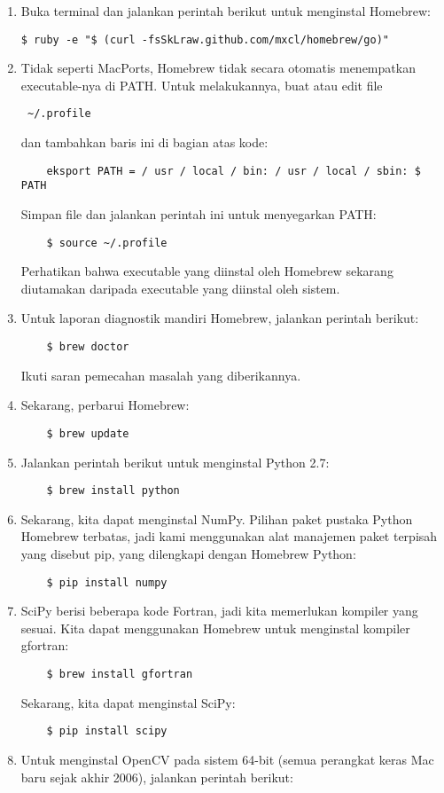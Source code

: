 \begin{enumerate}
	\item Buka terminal dan jalankan perintah berikut untuk menginstal Homebrew:
	\begin{verbatim}$ ruby ​​-e "$ (curl -fsSkLraw.github.com/mxcl/homebrew/go)" \end{verbatim} 
	\item Tidak seperti MacPorts, Homebrew tidak secara otomatis menempatkan executable-nya di PATH. Untuk melakukannya, buat atau edit file \begin{verbatim} ~/.profile \end{verbatim} dan tambahkan baris ini di bagian atas kode:
	\begin{verbatim} 
	eksport PATH = / usr / local / bin: / usr / local / sbin: $ PATH
	\end{verbatim}
	Simpan file dan jalankan perintah ini untuk menyegarkan PATH:
	\begin{verbatim} 
	$ source ~/.profile
	\end{verbatim}
	Perhatikan bahwa executable yang diinstal oleh Homebrew sekarang diutamakan daripada executable yang diinstal oleh sistem.

	\item Untuk laporan diagnostik mandiri Homebrew, jalankan perintah berikut:
	\begin{verbatim} 
	$ brew doctor
	\end{verbatim}
	Ikuti saran pemecahan masalah yang diberikannya.
	\item Sekarang, perbarui Homebrew:
	\begin{verbatim} 
	$ brew update
	\end{verbatim}
	\item Jalankan perintah berikut untuk menginstal Python 2.7:
	\begin{verbatim} 
	$ brew install python
	\end{verbatim}	
	\item Sekarang, kita dapat menginstal NumPy. Pilihan paket pustaka Python Homebrew terbatas, jadi kami menggunakan alat manajemen paket terpisah yang disebut pip, yang dilengkapi dengan Homebrew Python:
	\begin{verbatim} 
	$ pip install numpy
	\end{verbatim}
	\item SciPy berisi beberapa kode Fortran, jadi kita memerlukan kompiler yang sesuai. Kita dapat menggunakan Homebrew untuk menginstal kompiler gfortran:
	\begin{verbatim} 
	$ brew install gfortran
	\end{verbatim}
	Sekarang, kita dapat menginstal SciPy:
	\begin{verbatim} 
	$ pip install scipy
	\end{verbatim}
	\item Untuk menginstal OpenCV pada sistem 64-bit (semua perangkat keras Mac baru sejak akhir 2006), jalankan
	perintah berikut:
	

\end{enumerate}
